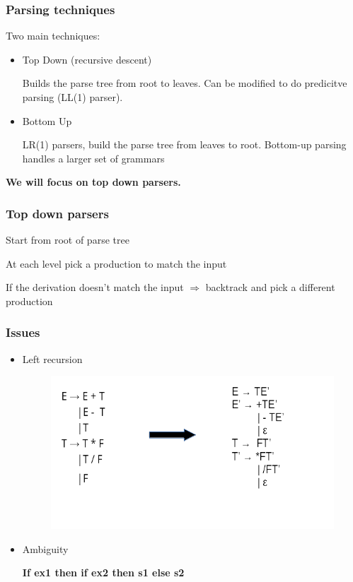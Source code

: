 \begin{frame}
    \frametitle{Parsing techniques}
    Two main techniques:
    \begin{itemize}
        \item Top Down (recursive descent)
        
        Builds the parse tree from root to leaves. 
        Can be modified to do predicitve parsing (LL(1) parser).
        \item Bottom Up
        
        LR(1) parsers, build the parse tree from leaves to root. Bottom-up parsing handles a larger set of
        grammars
    \end{itemize}
   
    \textbf{We will focus on top down parsers.}
\end{frame}
\begin{frame}
    \frametitle{Top down parsers}
    \begin{block}{}Start from root of parse tree \end{block}
    \begin{block}{}At each level pick a production to match the input\end{block}
    \begin{block}{}If the derivation doesn't match the input $\Rightarrow$ backtrack and pick a different production\end{block}
\end{frame}

\begin{frame}
    \frametitle{Issues}
    \begin{itemize}
    \item Left recursion
        \begin{figure}
        \includegraphics[scale=0.35 ]{img/noleftrec.png}
        \end{figure}
    \item Ambiguity
       \begin{center}
           \textbf{If ex1 then if ex2 then s1 else s2}
       \end{center}
    \end{itemize}
  
  
\end{frame}